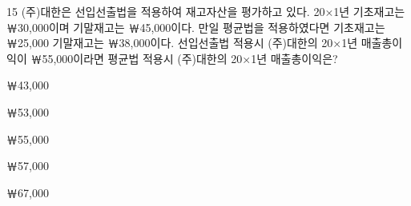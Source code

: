 \begin{question}{15}
(주)대한은 선입선출법을 적용하여 재고자산을 평가하고 있다. 20×1년 기초재고는 ￦30,000이며 기말재고는 ￦45,000이다. 만일 평균법을 적용하였다면 기초재고는 ￦25,000 기말재고는 ￦38,000이다. 선입선출법 적용시 (주)대한의 20×1년 매출총이익이 ￦55,000이라면 평균법 적용시 (주)대한의 20×1년 매출총이익은?
\begin{choices}
  \item ￦43,000
  \item ￦53,000
  \item ￦55,000
  \item ￦57,000
  \item ￦67,000
\end{choices}
\end{question}
